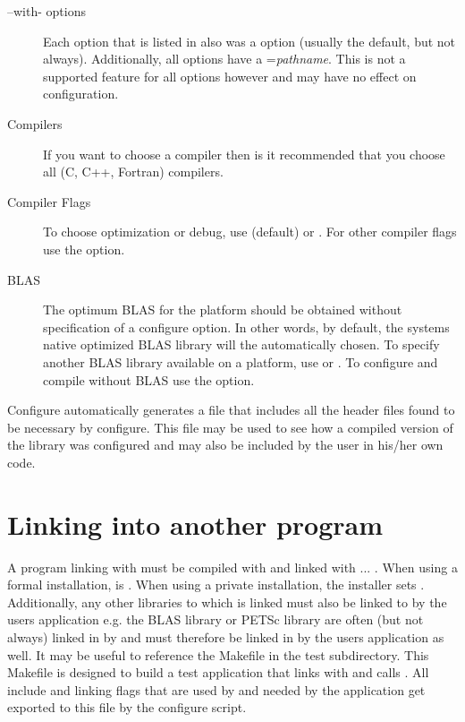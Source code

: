 \begin{description}

\item[--with- options] Each  option that is listed in
 also was a  option (usually the
default, but not always).  Additionally, all  options
have a ={\it pathname}.  This is not a
supported feature for all  options however and may have
no effect on configuration.

\item[Compilers] If you want to choose a compiler then is it recommended
that you choose all (C, C++, Fortran) compilers.

\item[Compiler Flags] To choose optimization or debug, use
 (default) or .
For other compiler flags use the  option.

\item[BLAS] The optimum BLAS for the platform should be obtained
without specification of a configure option.  In other words, by
default, the systems native optimized BLAS library will the
automatically chosen.  To specify another BLAS library available on a
platform, use  or
.  To configure and compile without
BLAS use the  option.
\end{description}

Configure automatically generates a file  that
includes all the header files found to be necessary by configure.
This file may be used to see how a compiled version of the library was
configured and may also be included by the user in his/her own code.

\section{Linking into another program}

A program linking with \hypre{} must be compiled with
 and linked with
... 
.
When using a formal \hypre{} installation,  is
.
When using a private installation, the installer sets
.  Additionally, any other libraries to which \hypre{}
is linked must also be linked to by the users application e.g. the
BLAS library or PETSc library are often (but not always) linked in by
\hypre{} and must therefore be linked in by the users
application as well.  It may be useful to reference the Makefile in
the test subdirectory.  This Makefile is designed to build a test
application that links with and calls \hypre{}.  All include and
linking flags that are used by \hypre{} and needed by the application
get exported to this file by the configure script.
